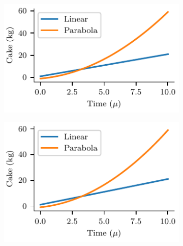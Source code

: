 \documentclass[a4paper,11pt]{report} %
\numberwithin{equation}{section}
\begin{document}
\begin{figure}
	\centering
	\begin{subfigure}{0.49\textwidth}
		\centering
		\includegraphics[width=1\linewidth]{fig/TwoGolden.pdf}
		\caption{}
	\end{subfigure}
	\begin{subfigure}{0.49\textwidth}
		\centering
		\includegraphics[width=1\linewidth]{fig/TwoInnerGolden.pdf}
		\caption{}
	\end{subfigure}
	\caption{}
\end{figure}
\end{document}
